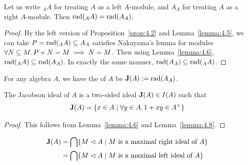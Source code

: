 


\begin{lemma}\label{lemma:4.8}
Let us write ${}_{A}A$ for treating $A$ as a left $A$-module, and
$A_{A}$ for treating $A$ as a right $A$-module. Then $\Rad({}_{A}A)=\Rad(A_{A})$.
\end{lemma}

\begin{proof}
By the left version of Proposition~\ref{prop:4.2} and Lemma~\ref{lemma:4.5},
we can take $P=\Rad({}_{A}A)\subset A_{A}$ satisfies Nakayama's lemma
for modules $\forall N\subset M\ldotp P+N=M\implies N=M$. Then using
Lemma~\ref{lemma:4.6}, $\Rad({}_{A}A)\subset\Rad(A_{A})$. In exactly
the same manner, $\Rad(A_{A})\subset\Rad({}_{A}A)$.
\end{proof}

\begin{definition}
For any algebra $A$, we have the  of $A$ be $\Jacobson(A):=\Rad(A_{A})$.
\end{definition}

\begin{proposition}\label{prop:4.9}
The Jacobson ideal of $A$ is a two-sided ideal $\Jacobson(A)\in I(A)$
such that
\begin{equation*}
\Jacobson(A)=\{x\in A\mid\forall y\in A\ldotp 1+xy\in A^{\times}\}
\end{equation*}
\end{proposition}

\begin{proof}
This follows from Lemma~\ref{lemma:4.6} and Lemma~\ref{lemma:4.8}.
\end{proof}

\begin{fact}
\begin{equation*}
\begin{split}
\Jacobson(A) &= \bigcap\{M\properideal A\mid M\mbox{ is a maximal right ideal of }A\}\\
&= \bigcap\{M\properideal A\mid M\mbox{ is a maximal left ideal of }A\}
\end{split}
\end{equation*}
\end{fact}

